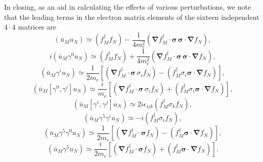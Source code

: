 In closing, as an aid in calculating the effects of various perturbations, we
note that the leading terms in the electron matrix elements of the sixteen
independent $4\cdot4$ matrices are
\begin{equation}
 (\bar u_Mu_N)\simeq(f_M^\dagger f_N)
 -\frac1{4m_e^2}(\boldsymbol\nabla f_M^\dagger\cdot\boldsymbol\sigma\,
 \boldsymbol\sigma\cdot\boldsymbol\nabla f_N),
 \tag{14.1.40}\label{eq:14.1.40}
\end{equation}
\begin{equation}
 i(\bar u_M\gamma^0u_N)\simeq(f_M^\dagger f_N)
 +\frac1{4m_e^2}(\boldsymbol\nabla f_M^\dagger\cdot\boldsymbol\sigma\,
 \boldsymbol\sigma\cdot\boldsymbol\nabla f_N),
 \tag{14.1.41}\label{eq:14.1.41}
\end{equation}
\begin{equation}
 (\bar u_M\gamma^iu_N)\simeq\frac1{2m_e}
 \left[(\boldsymbol\nabla f_M^\dagger\cdot\boldsymbol\sigma\,\sigma_i f_N)
 -(f_M^\dagger\sigma_i\boldsymbol\sigma\cdot\boldsymbol\nabla f_N)\right],
 \tag{14.1.42}\label{eq:14.1.42}
\end{equation}
\begin{equation}
 (\bar u_M[\gamma^0,\gamma^i]u_N)\simeq\frac{i}{m_e}
 \left[(\boldsymbol\nabla f_M^\dagger\cdot\boldsymbol\sigma\,\sigma_i f_N)
 +(f_M^\dagger\sigma_i\boldsymbol\sigma\cdot\boldsymbol\nabla f_N)\right],
 \tag{14.1.43}\label{eq:14.1.43}
\end{equation}
\begin{equation}
 (\bar u_M[\gamma^i,\gamma^j]u_N)\simeq
 2i\epsilon_{ijk}(f_M^\dagger\sigma_kf_N),
 \tag{14.1.44}\label{eq:14.1.44}
\end{equation}
\begin{equation}
 (\bar u_M\gamma^5\gamma^iu_N)\simeq-i(f_M^\dagger\sigma_if_N),
 \tag{14.1.45}\label{eq:14.1.45}
\end{equation}
\begin{equation}
 (\bar u_M\gamma^5\gamma^0u_N)\simeq\frac1{2m_e}
 \left[(\boldsymbol\nabla f_M^\dagger\cdot\boldsymbol\sigma f_N)
 -(f_M^\dagger\boldsymbol\sigma\cdot\boldsymbol\nabla f_N)\right],
 \tag{14.1.46}\label{eq:14.1.46}
\end{equation}
\begin{equation}
 (\bar u_M\gamma^5u_N)\simeq\frac{i}{2m_e}
 \left[(\boldsymbol\nabla f_M^\dagger\cdot\boldsymbol\sigma f_N)
 +(f_M^\dagger\boldsymbol\sigma\cdot\boldsymbol\nabla f_N)\right].
 \tag{14.1.47}\label{eq:14.1.47}
\end{equation}
